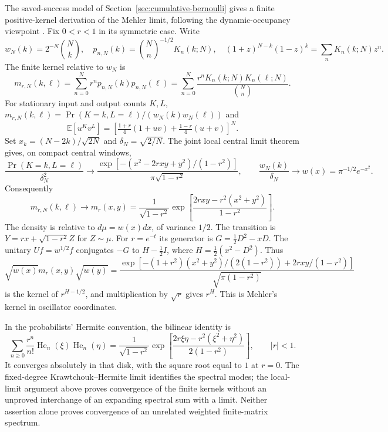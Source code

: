 \documentclass[11pt,reqno]{amsart}
\begin{document}
The saved-success model of Section~\ref{sec:cumulative-bernoulli}
gives a finite positive-kernel derivation of the Mehler limit,
following the dynamic-occupancy viewpoint
\cite{CooperHoareRahman1977,HoareRahman1984}. Fix $0<r<1$ in its
symmetric case. Write
\[
w_N(k)=2^{-N}\binom Nk,\quad
p_{n,N}(k)=\binom Nn^{-1/2}K_n(k;N),\quad
(1+z)^{N-k}(1-z)^k=\sum_nK_n(k;N)z^n.
\]
The finite kernel relative to $w_N$ is
\begin{equation}\label{eq:ency-finite-mehler}
m_{r,N}(k,\ell)=\sum_{n=0}^Nr^np_{n,N}(k)p_{n,N}(\ell)
=\sum_{n=0}^N\frac{r^nK_n(k;N)K_n(\ell;N)}{\binom Nn}.
\end{equation}
For stationary input and output counts $K,L$,
$m_{r,N}(k,\ell)=\Pr(K=k,L=\ell)/(w_N(k)w_N(\ell))$ and
\[
\mathbb E[u^Kv^L]=
\left[\tfrac{1+r}{4}(1+uv)+\tfrac{1-r}{4}(u+v)\right]^N.
\]
Set $x_k=(N-2k)/\sqrt{2N}$ and $\delta_N=\sqrt{2/N}$.
The joint local central limit theorem gives, on compact central windows,
\[
\frac{\Pr(K=k,L=\ell)}{\delta_N^2}\longrightarrow
\frac{\exp[-(x^2-2rxy+y^2)/(1-r^2)]}{\pi\sqrt{1-r^2}},
\qquad \frac{w_N(k)}{\delta_N}\longrightarrow
w(x)=\pi^{-1/2}e^{-x^2}.
\]
Consequently
\begin{equation}\label{eq:ency-mehler-ratio}
m_{r,N}(k,\ell)\longrightarrow m_r(x,y)
=\frac1{\sqrt{1-r^2}}
\exp\left[\frac{2rxy-r^2(x^2+y^2)}{1-r^2}\right].
\end{equation}
The density is relative to $d\mu=w(x)dx$, of variance $1/2$.
The transition is $Y=rx+\sqrt{1-r^2}Z$ for $Z\sim\mu$.
For $r=e^{-t}$ its generator is $G=\frac12D^2-xD$.
The unitary $Uf=w^{1/2}f$ conjugates $-G$ to
$H-\frac12I$, where $H=\frac12(x^2-D^2)$. Thus
\[
\sqrt{w(x)}m_r(x,y)\sqrt{w(y)}
=\frac{\exp[-(1+r^2)(x^2+y^2)/(2(1-r^2))+2rxy/(1-r^2)]}
{\sqrt{\pi(1-r^2)}}
\]
is the kernel of $r^{H-1/2}$, and multiplication by $\sqrt r$ gives
$r^H$. This is Mehler's kernel in oscillator coordinates.

In the probabilists' Hermite convention,
the bilinear identity is
\[
\sum_{n\ge0}\frac{r^n}{n!}\operatorname{He}_n(\xi)
\operatorname{He}_n(\eta)
=\frac1{\sqrt{1-r^2}}
\exp\left[\frac{2r\xi\eta-r^2(\xi^2+\eta^2)}{2(1-r^2)}\right],
\qquad |r|<1.
\]
It converges absolutely in that disk, with the square root equal to
$1$ at $r=0$. The fixed-degree Krawtchouk--Hermite limit identifies the
spectral modes; the local-limit argument above proves convergence of
the finite kernels without an unproved interchange of an expanding
spectral sum with a limit. Neither assertion alone proves convergence
of an unrelated weighted finite-matrix spectrum.
\end{document}
